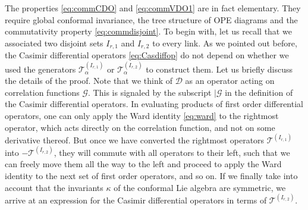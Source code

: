 \documentclass{article}
\def\cG{\mathcal{G}}
\begin{document}
The properties \eqref{eq:commCDO} and \eqref{eq:commVDO1} are in fact elementary. 
They require global conformal invariance, the tree structure of OPE diagrams
and the commutativity property \eqref{eq:commdisjoint}. To begin with, let us 
recall that we associated two disjoint sets $I_{r,1}$ and $I_{r,2}$ to every 
link. As we pointed out before, the Casimir differential operators 
\eqref{eq:Casdiffop} do not depend on whether we used the generators 
$\mathcal{T}_\alpha^{(I_{r,1})}$ or $\mathcal{T}_\alpha^{(I_{r,2})}$ to construct them. 
Let us briefly discuss 
the details of the proof. Note that we think of $\mathcal{D}$ as an operator acting 
on correlation functions $\cG$. This is signaled by the subscript $|\cG$ in the definition 
of the Casimir differential operators. In evaluating products of first order 
differential operators, one can only apply the Ward identity \eqref{eq:ward} to the 
rightmost operator, which acts directly on the correlation function, and not on some derivative thereof. But once we have converted the rightmost operators 
$\mathcal{T}^{(I_{r,1})}$ into $-\mathcal{T}^{(I_{r,2})}$, they will commute with all 
operators to their left, such that we can freely move them all the way to the left and proceed to 
apply the Ward identity to the next set of first order operators, and so on. If we finally 
take into account that the invariants $\kappa$ of the conformal Lie algebra are 
symmetric, we arrive at an expression for the Casimir differential operators in 
terms of $\mathcal{T}^{(I_{r,2})}$. 
\end{document}

